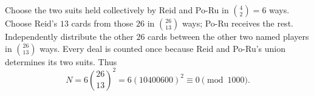 Choose the two suits held collectively by Reid and Po-Ru in $\binom42=6$ ways. Choose Reid's $13$ cards from those $26$ in $\binom{26}{13}$ ways; Po-Ru receives the rest. Independently distribute the other $26$ cards between the other two named players in $\binom{26}{13}$ ways. Every deal is counted once because Reid and Po-Ru's union determines its two suits. Thus
\[
N=6\binom{26}{13}^2=6(10400600)^2\equiv\boxed0\pmod{1000}.
\]
